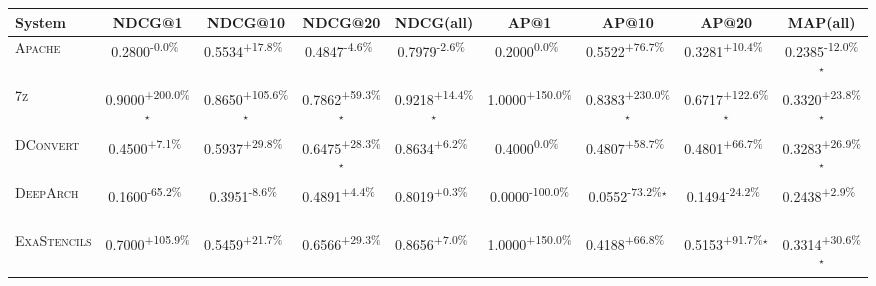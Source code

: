 \begin{table}[htbp]
\centering
\renewcommand{\arraystretch}{1.2}
\begin{tabular}{l|cccc|cccc}
\hline
System & NDCG@1 & NDCG@10 & NDCG@20 & NDCG(all) & AP@1 & AP@10 & AP@20 & MAP(all) \\ \hline
\textsc{Apache} & \cellcolor{red!30}0.2800\textsuperscript{-0.0\%}$^{\,\,\,}$ & \cellcolor{green!30}0.5534\textsuperscript{+17.8\%}$^{\,\,\,}$ & \cellcolor{red!30}0.4847\textsuperscript{-4.6\%}$^{\,\,\,}$ & \cellcolor{red!30}0.7979\textsuperscript{-2.6\%}$^{\,\,\,}$ & \cellcolor{red!30}0.2000\textsuperscript{0.0\%}$^{\,\,\,}$ & \cellcolor{green!30}0.5522\textsuperscript{+76.7\%}$^{\,\,\,}$ & \cellcolor{green!30}0.3281\textsuperscript{+10.4\%}$^{\,\,\,}$ & \cellcolor{red!30}0.2385\textsuperscript{-12.0\%}$^\star$ \\
\textsc{7z} & \cellcolor{green!30}0.9000\textsuperscript{+200.0\%}$^\star$ & \cellcolor{green!30}0.8650\textsuperscript{+105.6\%}$^\star$ & \cellcolor{green!30}0.7862\textsuperscript{+59.3\%}$^\star$ & \cellcolor{green!30}0.9218\textsuperscript{+14.4\%}$^\star$ & \cellcolor{green!30}1.0000\textsuperscript{+150.0\%}$^{\,\,\,}$ & \cellcolor{green!30}0.8383\textsuperscript{+230.0\%}$^\star$ & \cellcolor{green!30}0.6717\textsuperscript{+122.6\%}$^\star$ & \cellcolor{green!30}0.3320\textsuperscript{+23.8\%}$^\star$ \\
\textsc{DConvert} & \cellcolor{green!30}0.4500\textsuperscript{+7.1\%}$^{\,\,\,}$ & \cellcolor{green!30}0.5937\textsuperscript{+29.8\%}$^{\,\,\,}$ & \cellcolor{green!30}0.6475\textsuperscript{+28.3\%}$^\star$ & \cellcolor{green!30}0.8634\textsuperscript{+6.2\%}$^{\,\,\,}$ & \cellcolor{red!30}0.4000\textsuperscript{0.0\%}$^{\,\,\,}$ & \cellcolor{green!30}0.4807\textsuperscript{+58.7\%}$^{\,\,\,}$ & \cellcolor{green!30}0.4801\textsuperscript{+66.7\%}$^{\,\,\,}$ & \cellcolor{green!30}0.3283\textsuperscript{+26.9\%}$^\star$ \\
\textsc{DeepArch} & \cellcolor{red!30}0.1600\textsuperscript{-65.2\%}$^{\,\,\,}$ & \cellcolor{red!30}0.3951\textsuperscript{-8.6\%}$^{\,\,\,}$ & \cellcolor{green!30}0.4891\textsuperscript{+4.4\%}$^{\,\,\,}$ & \cellcolor{green!30}0.8019\textsuperscript{+0.3\%}$^{\,\,\,}$ & \cellcolor{red!30}0.0000\textsuperscript{-100.0\%}$^{\,\,\,}$ & \cellcolor{red!30}0.0552\textsuperscript{-73.2\%}$^\star$ & \cellcolor{red!30}0.1494\textsuperscript{-24.2\%}$^{\,\,\,}$ & \cellcolor{green!30}0.2438\textsuperscript{+2.9\%}$^{\,\,\,}$ \\
\textsc{ExaStencils} & \cellcolor{green!30}0.7000\textsuperscript{+105.9\%}$^{\,\,\,}$ & \cellcolor{green!30}0.5459\textsuperscript{+21.7\%}$^{\,\,\,}$ & \cellcolor{green!30}0.6566\textsuperscript{+29.3\%}$^{\,\,\,}$ & \cellcolor{green!30}0.8656\textsuperscript{+7.0\%}$^{\,\,\,}$ & \cellcolor{green!30}1.0000\textsuperscript{+150.0\%}$^{\,\,\,}$ & \cellcolor{green!30}0.4188\textsuperscript{+66.8\%}$^{\,\,\,}$ & \cellcolor{green!30}0.5153\textsuperscript{+91.7\%}$^\star$ & \cellcolor{green!30}0.3314\textsuperscript{+30.6\%}$^\star$ \\

\end{tabular}
\end{table}

